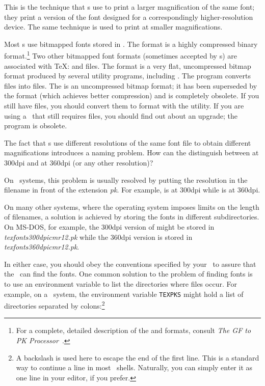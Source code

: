 This is the technique that \dvidriver{}s use to print a larger 
magnification of the same font; they print a version of the font
designed for a correspondingly higher-resolution device.  The same
technique is used to print at smaller magnifications.

Most \dvidriver{}s use bitmapped fonts stored in .  The
 format is a highly compressed binary format.\footnote{For a
complete, detailed description of the  and  formats,
consult {\it The GF to PK Processor}~\cite{mfware:gftopk}.}  
Two other bitmapped font formats
(sometimes accepted by \dvidriver{}s) are associated with \TeX:
 and  files.  
The  format is a very flat,
uncompressed bitmap format produced by several utility programs,
including \MF.  The  program converts  files
into  files.  The  is an uncompressed bitmap
format; it has been superseded by the  format (which achieves
better compression) and is completely obsolete.  If you still have
 files, you should convert them to  format with the
 utility.  If you are using a \dvidriver\ that still
requires  files, you should find out about an upgrade;
the program is obsolete.

The fact that \dvidriver{}s use different resolutions of the same
font file to obtain different magnifications introduces
a naming problem.  How can the \dvidriver{} distinguish between
 at 300dpi and  at 360dpi (or any
other resolution)?  

On \Unix\ systems, this problem is usually resolved by putting the
resolution in the filename in front of the extension \textit{pk}.
For example,  is  at 300dpi while
 is  at 360dpi.

On many other systems, where the operating system imposes limits on
the length of filenames, a solution is achieved by storing the
fonts in different subdirectories.  On MS-DOS, for example,
the 300dpi version of  might be stored in 
\textit{\bs texfonts\bs 300dpi\bs cmr12.pk} while the 360dpi version is
stored in \textit{\bs texfonts\bs 360dpi\bs cmr12.pk}.    

In either case, you should obey the conventions specified by your
\dvidriver\ to assure that the \dvidriver\ can find the
fonts.  One common solution to the problem of finding fonts is to
use an environment variable to list the directories where 
files occur.
For example, on a \Unix\ system, the environment variable \verb|TEXPKS|
might hold a list of directories separated by colons:\footnote{A backslash
is used here to escape the end of the first line.  This is a standard way
to continue a line in most \Unix\ shells.  Naturally, you can simply enter
it as one line in your editor, if you prefer.}

